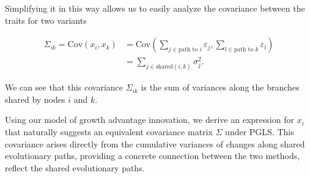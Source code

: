\documentclass[12pt,oneside,letterpaper]{article}
\begin{document}
Simplifying it in this way allows us to easily analyze the covariance between the traits for two variants

\begin{align*}
    \Sigma_{ik} = \text{Cov}(x_i, x_k) &= \text{Cov} \left( \sum_{j \in \text{path to } i} \varepsilon_j, \sum_{l \in \text{path to } k} \varepsilon_l \right)\\
		&= \sum_{j \in \text{shared}(i, k)} \sigma_j^2.
\end{align*}

We can see that this covariance $\Sigma_{ik}$ is the sum of variances along the branches shared by nodes $i$ and $k$. 

Using our model of growth advantage innovation, we derive an expression for $x_i$ that naturally suggests an equivalent covariance matrix $\Sigma$ under PGLS.
This covariance arises directly from the cumulative variances of changes along shared evolutionary paths, providing a concrete connection between the two methods, reflect the shared evolutionary paths.
\end{document}
